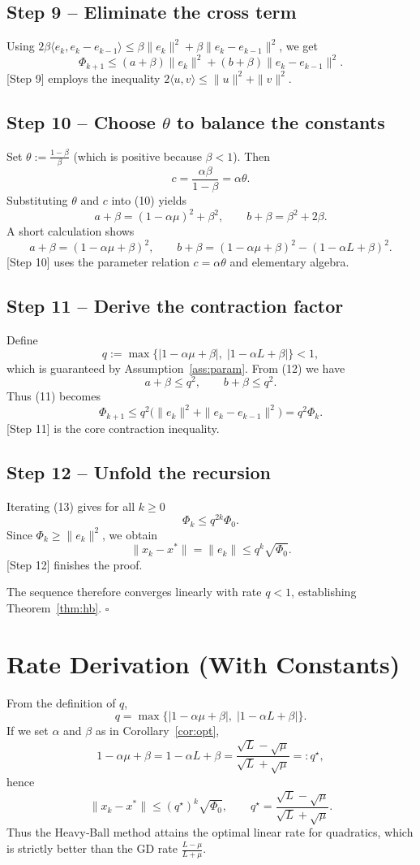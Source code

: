 \documentclass[11pt]{article}
\begin{document}
\subsection*{Step 9 – Eliminate the cross term}
Using $2\beta\langle e_{k},e_{k}-e_{k-1}\rangle\le
\beta\|e_{k}\|^{2}+\beta\|e_{k}-e_{k-1}\|^{2}$, we get
\[
\Phi_{k+1}\le (a+\beta)\|e_{k}\|^{2}+(b+\beta)\|e_{k}-e_{k-1}\|^{2}.
\tag{11}
\]
[Step 9] employs the inequality $2\langle u,v\rangle\le\|u\|^{2}+\|v\|^{2}$.

\subsection*{Step 10 – Choose $\theta$ to balance the constants}
Set $\theta:=\frac{1-\beta}{\beta}$ (which is positive because $\beta<1$).  Then
\[
c=\frac{\alpha\beta}{1-\beta}=\alpha\theta.
\]
Substituting $\theta$ and $c$ into (10) yields
\[
a+\beta = (1-\alpha\mu)^{2}+\beta^{2},
\qquad
b+\beta = \beta^{2}+2\beta.
\]
A short calculation shows
\[
a+\beta = (1-\alpha\mu+\beta)^{2},\qquad
b+\beta = (1-\alpha\mu+\beta)^{2}-(1-\alpha L+\beta)^{2}.
\tag{12}
\]
[Step 10] uses the parameter relation $c=\alpha\theta$ and elementary algebra.

\subsection*{Step 11 – Derive the contraction factor}
Define
\[
q:=\max\bigl\{|1-\alpha\mu+\beta|,\;|1-\alpha L+\beta|\bigr\}<1,
\]
which is guaranteed by Assumption~\ref{ass:param}.  From (12) we have
\[
a+\beta\le q^{2},\qquad b+\beta\le q^{2}.
\]
Thus (11) becomes
\[
\Phi_{k+1}\le q^{2}\bigl(\|e_{k}\|^{2}+\|e_{k}-e_{k-1}\|^{2}\bigr)
= q^{2}\Phi_{k}.
\tag{13}
\]
[Step 11] is the core contraction inequality.

\subsection*{Step 12 – Unfold the recursion}
Iterating (13) gives for all $k\ge0$
\[
\Phi_{k}\le q^{2k}\Phi_{0}.
\]
Since $\Phi_{k}\ge\|e_{k}\|^{2}$, we obtain
\[
\|x_{k}-x^{*}\|=\|e_{k}\|\le q^{k}\sqrt{\Phi_{0}}.
\tag{14}
\]
[Step 12] finishes the proof.

\noindent The sequence therefore converges linearly with rate $q<1$, establishing Theorem~\ref{thm:hb}. $\square$

\section*{Rate Derivation (With Constants)}
From the definition of $q$,
\[
q=\max\bigl\{|1-\alpha\mu+\beta|,\;|1-\alpha L+\beta|\bigr\}.
\]
If we set $\alpha$ and $\beta$ as in Corollary~\ref{cor:opt},
\[
1-\alpha\mu+\beta = 1-\alpha L+\beta = \frac{\sqrt{L}-\sqrt{\mu}}{\sqrt{L}+\sqrt{\mu}}=:q^{\star},
\]
hence
\[
\|x_{k}-x^{*}\|\le (q^{\star})^{k}\sqrt{\Phi_{0}},
\qquad
q^{\star}= \frac{\sqrt{L}-\sqrt{\mu}}{\sqrt{L}+\sqrt{\mu}}.
\]
Thus the Heavy‑Ball method attains the optimal linear rate for quadratics, which is strictly better than the GD rate $\frac{L-\mu}{L+\mu}$.
\end{document}
